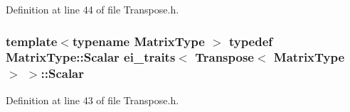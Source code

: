 Definition at line 44 of file Transpose.\-h.

\hypertarget{structei__traits_3_01_transpose_3_01_matrix_type_01_4_01_4_a2dcd945e68ae91111c199fb06320c597}{
\subsubsection[{Scalar}]{\setlength{\rightskip}{0pt plus 5cm}template$<$typename Matrix\-Type $>$ typedef Matrix\-Type\-::\-Scalar {\bf ei\-\_\-traits}$<$ {\bf Transpose}$<$ Matrix\-Type $>$ $>$\-::{\bf Scalar}}}\label{structei__traits_3_01_transpose_3_01_matrix_type_01_4_01_4_a2dcd945e68ae91111c199fb06320c597}


Definition at line 43 of file Transpose.\-h.



